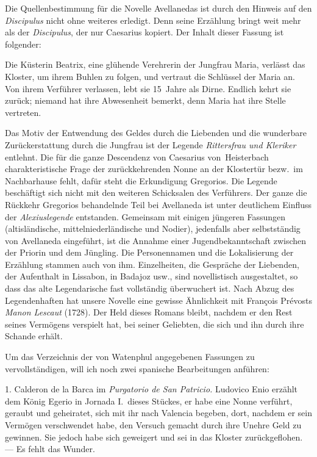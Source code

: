 Die Quellenbestimmung für die Novelle Avellanedas ist durch den
Hinweis auf den {\it Discipulus} nicht ohne weiteres erledigt. Denn seine
Erzählung bringt weit mehr als der {\it Discipulus}, der nur Caesarius
kopiert. Der Inhalt dieser Fassung ist folgender:

{\quoted Die Küsterin Beatrix, eine glühende Verehrerin der Jungfrau Maria,
verlässt das Kloster, um ihrem Buhlen zu folgen, und vertraut die Schlüssel
der Maria an. Von ihrem Verführer verlassen, lebt sie 15~Jahre als
Dirne. Endlich kehrt sie zurück; niemand hat ihre Abwesenheit bemerkt,
denn Maria hat ihre Stelle vertreten.}

Das Motiv der Entwendung des Geldes durch die Liebenden und
die wunderbare Zurückerstattung durch die Jungfrau ist der Legende
{\it Rittersfrau und Kleriker} entlehnt. Die für die ganze Descendenz von
Caesarius von~Heisterbach charakteristische Frage der zurückkehrenden
Nonne an der Klostertür bezw.\ im Nachbarhause fehlt, dafür steht die
Erkundigung Gregorios. Die Legende beschäftigt sich nicht mit den
weiteren Schicksalen des Verführers. Der ganze die Rückkehr Gregorios
behandelnde Teil bei Avellaneda ist unter deutlichem Einfluss der
{\it Alexiuslegende} entstanden. Gemeinsam mit einigen jüngeren Fassungen
(altisländische, mittelniederländische und Nodier),
jedenfalls aber selbstständig von Avellaneda eingeführt, ist die Annahme einer
Jugendbekanntschaft zwischen der Priorin und dem Jüngling. Die Personennamen und
die Lokalisierung der Erzählung stammen auch von ihm. Einzelheiten,
die Gespräche der Liebenden, der Aufenthalt in Lissabon, in Badajoz usw.,
sind novellistisch ausgestaltet, so dass das alte Legendarische fast
vollständig überwuchert ist. Nach Abzug des Legendenhaften hat unsere
Novelle eine gewisse Ähnlichkeit mit François Prévosts {\it Manon Lescaut}
(1728). Der Held dieses Romans bleibt, nachdem er den Rest seines
Vermögens verspielt hat, bei seiner Geliebten, die sich und ihn durch
ihre Schande erhält.

Um das Verzeichnis der von Watenphul angegebenen Fassungen
zu vervollständigen, will ich noch zwei spanische Bearbeitungen anführen:

1. Calderon de la Barca im {\it Purgatorio de San Patricio.} Ludovico
Enio erzählt dem König Egerio in Jornada I.\ dieses Stückes, er habe
eine Nonne verführt, geraubt und geheiratet, sich mit ihr nach Valencia
begeben, dort, nachdem er sein Vermögen verschwendet habe, den Versuch
gemacht durch ihre Unehre Geld zu gewinnen. Sie jedoch habe sich
geweigert und sei in das Kloster zurückgeflohen. --- Es fehlt das Wunder.

